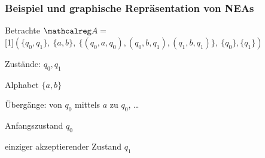     \begin{frame}
      \frametitle{Beispiel und graphische Repräsentation von NEAs}
      
      \begin{exampleblock}{}
        Betrachte $\Aut{A} =$\\
        \scalebox{.98}[1]{$(\{q_0,q_1\},~ \{a,b\},~ \{(q_0,a,q_0), (q_0,b,q_1), (q_1,b,q_1)\},~ \{q_0\}, \{q_1\})$}
      \end{exampleblock}

      
      \begin{Itemize}
        \item
          Zustände: $q_0, q_1$
          \hfill
          \vspace*{1.4mm}%
        \item
          Alphabet $\{a,b\}$
          \vspace*{-6mm}
        \item
          Übergänge: von $q_0$ mittels $a$ zu $q_0$, \dots
          \hfill
        \item
          Anfangszustand $q_0$
          \hfill
          \vspace*{-1mm}%
        \item
          einziger akzeptierender Zustand $q_1$
          \hfill
      \end{Itemize}

      \vspace*{-4mm}
      \begin{center}
      \end{center}

    \end{frame}

